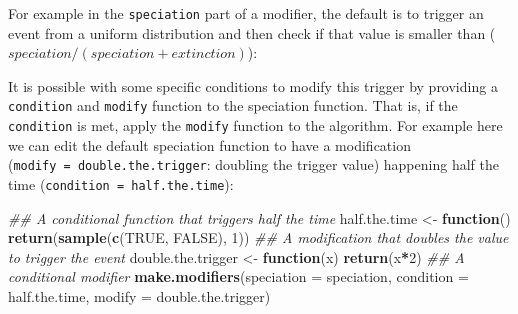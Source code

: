 \documentclass[
]{book}
\newenvironment{Shaded}{\begin{snugshade}}{\end{snugshade}}
\newcommand{\CommentTok}[1]{\textcolor[rgb]{0.56,0.35,0.01}{\textit{#1}}}
\newcommand{\ControlFlowTok}[1]{\textcolor[rgb]{0.13,0.29,0.53}{\textbf{#1}}}
\newcommand{\DataTypeTok}[1]{\textcolor[rgb]{0.13,0.29,0.53}{#1}}
\newcommand{\DecValTok}[1]{\textcolor[rgb]{0.00,0.00,0.81}{#1}}
\newcommand{\KeywordTok}[1]{\textcolor[rgb]{0.13,0.29,0.53}{\textbf{#1}}}
\newcommand{\NormalTok}[1]{#1}
\newcommand{\OperatorTok}[1]{\textcolor[rgb]{0.81,0.36,0.00}{\textbf{#1}}}
\newcommand{\OtherTok}[1]{\textcolor[rgb]{0.56,0.35,0.01}{#1}}
\newcommand{\StringTok}[1]{\textcolor[rgb]{0.31,0.60,0.02}{#1}}
\begin{document}
For example in the \texttt{speciation} part of a modifier, the default is to trigger an event from a uniform distribution and then check if that value is smaller than (\(speciation/(speciation + extinction)\)):

\begin{Shaded}
\end{Shaded}

It is possible with some specific conditions to modify this trigger by providing a \texttt{condition} and \texttt{modify} function to the speciation function.
That is, if the \texttt{condition} is met, apply the \texttt{modify} function to the algorithm.
For example here we can edit the default speciation function to have a modification (\texttt{modify\ =\ double.the.trigger}: doubling the trigger value) happening half the time (\texttt{condition\ =\ half.the.time}):

\begin{Shaded}
\begin{Highlighting}[]
\CommentTok{\#\# A conditional function that triggers half the time}
\NormalTok{half.the.time \textless{}{-}}\StringTok{ }\ControlFlowTok{function}\NormalTok{() }\KeywordTok{return}\NormalTok{(}\KeywordTok{sample}\NormalTok{(}\KeywordTok{c}\NormalTok{(}\OtherTok{TRUE}\NormalTok{, }\OtherTok{FALSE}\NormalTok{), }\DecValTok{1}\NormalTok{))}
\CommentTok{\#\# A modification that doubles the value to trigger the event}
\NormalTok{double.the.trigger \textless{}{-}}\StringTok{ }\ControlFlowTok{function}\NormalTok{(x) }\KeywordTok{return}\NormalTok{(x}\OperatorTok{*}\DecValTok{2}\NormalTok{)}
\CommentTok{\#\# A conditional modifier}
\KeywordTok{make.modifiers}\NormalTok{(}\DataTypeTok{speciation =}\NormalTok{ speciation,}
               \DataTypeTok{condition  =}\NormalTok{ half.the.time, }
               \DataTypeTok{modify =}\NormalTok{ double.the.trigger)}
\end{Highlighting}
\end{Shaded}
\end{document}

